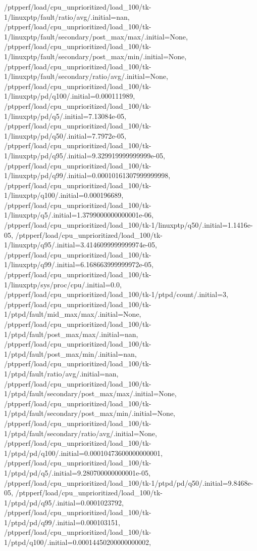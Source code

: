{    /ptpperf/load/cpu_unprioritized/load_100/tk-1/linuxptp/fault/ratio/avg/.initial=nan,
    /ptpperf/load/cpu_unprioritized/load_100/tk-1/linuxptp/fault/secondary/post_max/max/.initial=None,
    /ptpperf/load/cpu_unprioritized/load_100/tk-1/linuxptp/fault/secondary/post_max/min/.initial=None,
    /ptpperf/load/cpu_unprioritized/load_100/tk-1/linuxptp/fault/secondary/ratio/avg/.initial=None,
    /ptpperf/load/cpu_unprioritized/load_100/tk-1/linuxptp/pd/q100/.initial=0.000111989,
    /ptpperf/load/cpu_unprioritized/load_100/tk-1/linuxptp/pd/q5/.initial=7.13084e-05,
    /ptpperf/load/cpu_unprioritized/load_100/tk-1/linuxptp/pd/q50/.initial=7.7972e-05,
    /ptpperf/load/cpu_unprioritized/load_100/tk-1/linuxptp/pd/q95/.initial=9.329919999999999e-05,
    /ptpperf/load/cpu_unprioritized/load_100/tk-1/linuxptp/pd/q99/.initial=0.00010161307999999998,
    /ptpperf/load/cpu_unprioritized/load_100/tk-1/linuxptp/q100/.initial=0.000196689,
    /ptpperf/load/cpu_unprioritized/load_100/tk-1/linuxptp/q5/.initial=1.3799000000000001e-06,
    /ptpperf/load/cpu_unprioritized/load_100/tk-1/linuxptp/q50/.initial=1.1416e-05,
    /ptpperf/load/cpu_unprioritized/load_100/tk-1/linuxptp/q95/.initial=3.4146099999999974e-05,
    /ptpperf/load/cpu_unprioritized/load_100/tk-1/linuxptp/q99/.initial=6.168663999999972e-05,
    /ptpperf/load/cpu_unprioritized/load_100/tk-1/linuxptp/sys/proc/cpu/.initial=0.0,
    /ptpperf/load/cpu_unprioritized/load_100/tk-1/ptpd/count/.initial=3,
    /ptpperf/load/cpu_unprioritized/load_100/tk-1/ptpd/fault/mid_max/max/.initial=None,
    /ptpperf/load/cpu_unprioritized/load_100/tk-1/ptpd/fault/post_max/max/.initial=nan,
    /ptpperf/load/cpu_unprioritized/load_100/tk-1/ptpd/fault/post_max/min/.initial=nan,
    /ptpperf/load/cpu_unprioritized/load_100/tk-1/ptpd/fault/ratio/avg/.initial=nan,
    /ptpperf/load/cpu_unprioritized/load_100/tk-1/ptpd/fault/secondary/post_max/max/.initial=None,
    /ptpperf/load/cpu_unprioritized/load_100/tk-1/ptpd/fault/secondary/post_max/min/.initial=None,
    /ptpperf/load/cpu_unprioritized/load_100/tk-1/ptpd/fault/secondary/ratio/avg/.initial=None,
    /ptpperf/load/cpu_unprioritized/load_100/tk-1/ptpd/pd/q100/.initial=0.00010473600000000001,
    /ptpperf/load/cpu_unprioritized/load_100/tk-1/ptpd/pd/q5/.initial=9.280700000000001e-05,
    /ptpperf/load/cpu_unprioritized/load_100/tk-1/ptpd/pd/q50/.initial=9.8468e-05,
    /ptpperf/load/cpu_unprioritized/load_100/tk-1/ptpd/pd/q95/.initial=0.0001023792,
    /ptpperf/load/cpu_unprioritized/load_100/tk-1/ptpd/pd/q99/.initial=0.000103151,
    /ptpperf/load/cpu_unprioritized/load_100/tk-1/ptpd/q100/.initial=0.00014450200000000002,
}
